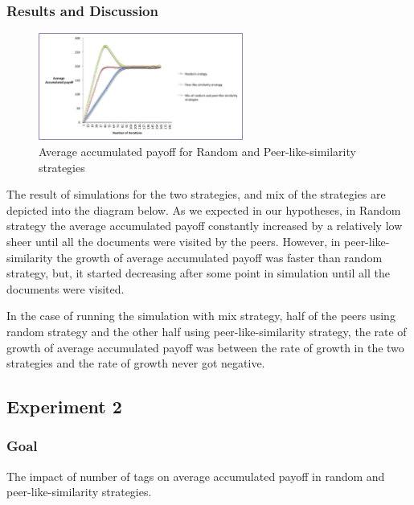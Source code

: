 \documentclass [12pt]{article} \usepackage{multicol}
\begin{document}
\subsubsection{Results and Discussion}

\begin{figure}[h!] \begin{center}
\includegraphics[width=0.6\textwidth,center]{images/randSimMix}
\caption{Average accumulated payoff for Random and Peer-like-similarity strategies} \end{center} \end{figure}

The result of simulations for the two strategies, and mix of the strategies are depicted into the diagram  below.
As we expected in our hypotheses, in Random strategy the average accumulated payoff constantly increased by a relatively low sheer until all
the documents were visited by the peers. However, in peer-like-similarity the growth of average accumulated payoff was faster than random strategy, 
but, it started decreasing after some point in simulation until all the documents were visited. 

In the case of running the simulation with mix strategy, half of the peers using random strategy and the other half using peer-like-similarity strategy, the rate of
growth of average accumulated payoff was between the rate of growth in the two strategies and the rate of growth never got negative. 


\subsection{Experiment 2}

\subsubsection{Goal}The impact of number of tags on average accumulated payoff in random and peer-like-similarity strategies.

\end{document}
